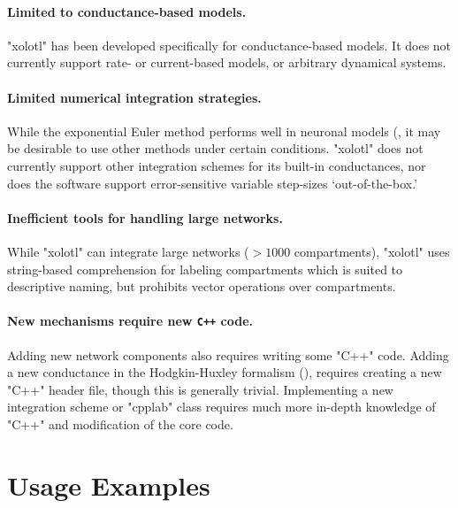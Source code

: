 \documentclass{frontiersSCNS} %
\begin{document}
\paragraph{Limited to conductance-based models.} "xolotl" has been developed specifically for conductance-based models. It does not currently support rate- or current-based models, or arbitrary dynamical systems. 

\paragraph{Limited numerical integration strategies.} While the exponential Euler method performs well in neuronal models (\cite{ohErrorAnalysisSpecialized2006, dayanTheoreticalNeuroscience2001}, it may be desirable to use other methods under certain conditions. "xolotl" does not currently support other integration schemes for its built-in conductances, nor does the software support error-sensitive variable step-sizes `out-of-the-box.'

\paragraph{Inefficient tools for handling large networks.} While "xolotl" can integrate large networks ($>1000$ compartments), "xolotl" uses string-based comprehension for labeling compartments which is suited to descriptive naming, but prohibits vector operations over compartments.

\paragraph{New mechanisms require new \texttt{C++} code.} Adding new network components also requires writing some "C++" code. Adding a new conductance in the Hodgkin-Huxley formalism (\cite{hodgkinMeasurementCurrentvoltageRelations1952, dayanTheoreticalNeuroscience2001}), requires creating a new "C++" header file, though this is generally trivial. Implementing a new integration scheme or "cpplab" class requires much more in-depth knowledge of "C++" and modification of the core code.

%
%
%
%
%
%

\section{Usage Examples}
\label{usage}
\end{document}
